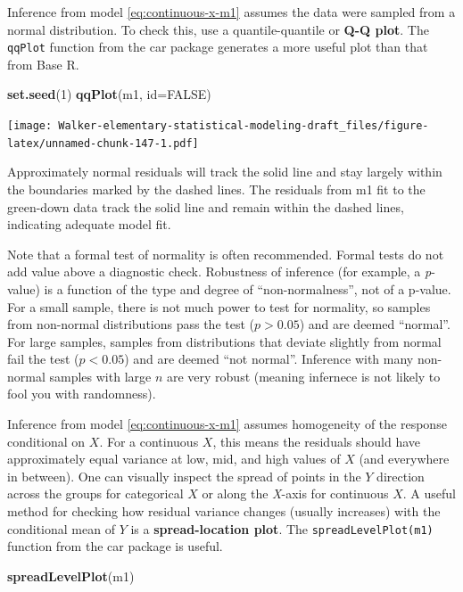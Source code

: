 \documentclass[]{book}
\newenvironment{Shaded}{\begin{snugshade}}{\end{snugshade}}
\newcommand{\DataTypeTok}[1]{\textcolor[rgb]{0.13,0.29,0.53}{#1}}
\newcommand{\DecValTok}[1]{\textcolor[rgb]{0.00,0.00,0.81}{#1}}
\newcommand{\KeywordTok}[1]{\textcolor[rgb]{0.13,0.29,0.53}{\textbf{#1}}}
\newcommand{\NormalTok}[1]{#1}
\newcommand{\OtherTok}[1]{\textcolor[rgb]{0.56,0.35,0.01}{#1}}
\begin{document}
Inference from model \eqref{eq:continuous-x-m1} assumes the data were sampled from a normal distribution. To check this, use a quantile-quantile or \textbf{Q-Q plot}. The \texttt{qqPlot} function from the car package generates a more useful plot than that from Base R.

\begin{Shaded}
\begin{Highlighting}[]
\KeywordTok{set.seed}\NormalTok{(}\DecValTok{1}\NormalTok{)}
\KeywordTok{qqPlot}\NormalTok{(m1, }\DataTypeTok{id=}\OtherTok{FALSE}\NormalTok{)}
\end{Highlighting}
\end{Shaded}

\texttt{[image: Walker-elementary-statistical-modeling-draft\_files/figure-latex/unnamed-chunk-147-1.pdf]}

Approximately normal residuals will track the solid line and stay largely within the boundaries marked by the dashed lines. The residuals from m1 fit to the green-down data track the solid line and remain within the dashed lines, indicating adequate model fit.

Note that a formal test of normality is often recommended. Formal tests do not add value above a diagnostic check. Robustness of inference (for example, a \emph{p}-value) is a function of the type and degree of ``non-normalness'', not of a p-value. For a small sample, there is not much power to test for normality, so samples from non-normal distributions pass the test (\(p > 0.05\)) and are deemed ``normal''. For large samples, samples from distributions that deviate slightly from normal fail the test (\(p < 0.05\)) and are deemed ``not normal''. Inference with many non-normal samples with large \(n\) are very robust (meaning infernece is not likely to fool you with randomness).

Inference from model \eqref{eq:continuous-x-m1} assumes homogeneity of the response conditional on \(X\). For a continuous \(X\), this means the residuals should have approximately equal variance at low, mid, and high values of \(X\) (and everywhere in between). One can visually inspect the spread of points in the \(Y\) direction across the groups for categorical \(X\) or along the \emph{X}-axis for continuous \(X\). A useful method for checking how residual variance changes (usually increases) with the conditional mean of \(Y\) is a \textbf{spread-location plot}. The \texttt{spreadLevelPlot(m1)} function from the car package is useful.

\begin{Shaded}
\begin{Highlighting}[]
\KeywordTok{spreadLevelPlot}\NormalTok{(m1)}
\end{Highlighting}
\end{Shaded}
\end{document}
